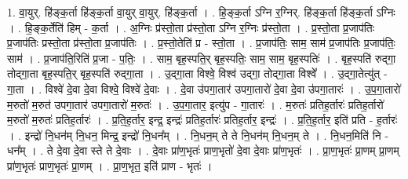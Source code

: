 \documentclass[17pt]{extarticle}
\begin{document}
1. वा॒युर्. हि॑ङ्क॒र्ता हि॑ङ्क॒र्ता वा॒युर् वा॒युर्. हि॑ङ्क॒र्ता । . हि॒ङ्क॒र्ता ऽग्नि र॒ग्निर्. हि॑ङ्क॒र्ता हि॑ङ्क॒र्ता ऽग्निः । . हि॒ङ्क॒र्तेति॑ हिम् - क॒र्ता । . अ॒ग्निः प्र॑स्तो॒ता प्र॑स्तो॒ता ऽग्नि र॒ग्निः प्र॑स्तो॒ता । . प्र॒स्तो॒ता प्र॒जाप॑तिः प्र॒जाप॑तिः प्रस्तो॒ता प्र॑स्तो॒ता प्र॒जाप॑तिः । . प्र॒स्तो॒तेति॑ प्र - स्तो॒ता । . प्र॒जाप॑तिः॒ साम॒ साम॑ प्र॒जाप॑तिः प्र॒जाप॑तिः॒ साम॑ । . प्र॒जाप॑ति॒रिति॑ प्र॒जा - प॒तिः॒ । . साम॒ बृह॒स्पति॒र् बृह॒स्पतिः॒ साम॒ साम॒ बृह॒स्पतिः॑ । . बृह॒स्पति॑ रुद्‍गा॒ तोद्‍गा॒ता बृह॒स्पति॒र् बृह॒स्पति॑ रुद्‍गा॒ता । . उ॒द्‍गा॒ता विश्वे॒ विश्व॑ उद्‍गा॒ तोद्‍गा॒ता विश्वे᳚ । . उ॒द्‍गा॒तेत्यु॑त् - गा॒ता । . विश्वे॑ दे॒वा दे॒वा विश्वे॒ विश्वे॑ दे॒वाः । . दे॒वा उ॑पगा॒तार॑ उपगा॒तारो॑ दे॒वा दे॒वा उ॑पगा॒तारः॑ । . उ॒प॒गा॒तारो॑ म॒रुतो॑ म॒रुत॑ उपगा॒तार॑ उपगा॒तारो॑ म॒रुतः॑ । . उ॒प॒गा॒तार॒ इत्यु॑प - गा॒तारः॑ । . म॒रुतः॑ प्रतिह॒र्तारः॑ प्रतिह॒र्तारो॑ म॒रुतो॑ म॒रुतः॑ प्रतिह॒र्तारः॑ । . प्र॒ति॒ह॒र्तार॒ इन्द्र॒ इन्द्रः॑ प्रतिह॒र्तारः॑ प्रतिह॒र्तार॒ इन्द्रः॑ । . प्र॒ति॒ह॒र्तार॒ इति॑ प्रति - ह॒र्तारः॑ । . इन्द्रो॑ नि॒धन॑म् नि॒धन॒ मिन्द्र॒ इन्द्रो॑ नि॒धन᳚म् । . नि॒धन॒म् ते ते नि॒धन॑म् नि॒धन॒म् ते । . नि॒धन॒मिति॑ नि - धन᳚म् । . ते दे॒वा दे॒वा स्ते ते दे॒वाः । . दे॒वाः प्रा॑ण॒भृतः॑ प्राण॒भृतो॑ दे॒वा दे॒वाः प्रा॑ण॒भृतः॑ । . प्रा॒ण॒भृतः॑ प्रा॒णम् प्रा॒णम् प्रा॑ण॒भृतः॑ प्राण॒भृतः॑ प्रा॒णम् । . प्रा॒ण॒भृत॒ इति॑ प्राण - भृतः॑ । \newline
\end{document}
